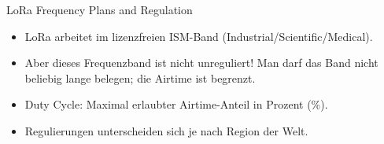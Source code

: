 \begin{frame}[t]{LoRa Frequency Plans and Regulation}

  \begin{itemize}
\item LoRa arbeitet im \alert{lizenzfreien ISM}-Band (Industrial/Scientific/Medical).
\item Aber dieses Frequenzband ist \alert{nicht unreguliert}! Man darf das Band \alert{nicht beliebig lange belegen}; die Airtime ist begrenzt.
\item \alert {Duty Cycle}: Maximal erlaubter Airtime-Anteil in Prozent (\%).
\item Regulierungen unterscheiden sich je nach Region der Welt.
  \end{itemize}
  \begin{center}
  \end{center}
\end{frame}
